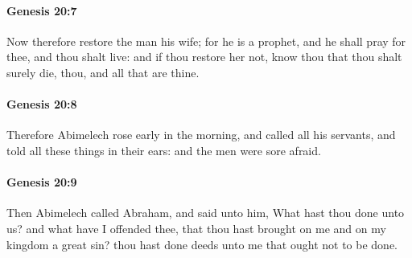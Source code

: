 		\paragraph{Genesis 20:7} %
			\label{GENESIS-20-7}

			Now therefore restore the man his wife; for he is a prophet, and he shall pray for thee, and thou shalt live: and if thou restore her not, know thou that thou shalt surely die, thou, and all that are thine.


		\paragraph{Genesis 20:8} %
			\label{GENESIS-20-8}

			Therefore Abimelech rose early in the morning, and called all his servants, and told all these things in their ears: and the men were sore afraid.


		\paragraph{Genesis 20:9} %
			\label{GENESIS-20-9}

			Then Abimelech called Abraham, and said unto him, What hast thou done unto us?  and what have I offended thee, that thou hast brought on me and on my kingdom a great sin?  thou hast done deeds unto me that ought not to be done.


